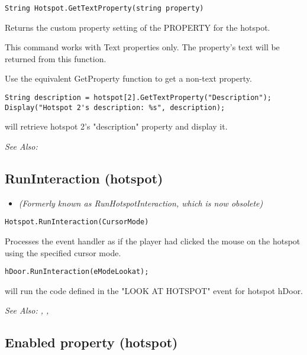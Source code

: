 \begin{verbatim}
String Hotspot.GetTextProperty(string property)
\end{verbatim}
Returns the custom property setting of the PROPERTY for the hotspot.

This command works with Text properties only. The property's text will be
returned from this function.

Use the equivalent GetProperty function to get a non-text property.

\begin{verbatim}
String description = hotspot[2].GetTextProperty("Description");
Display("Hotspot 2's description: %s", description);
\end{verbatim}
will retrieve hotspot 2's "description" property and display it.

\it{See Also:} 



\subsection{RunInteraction (hotspot)}\label{Hotspot.RunInteraction}%

\begin{itemize}
\item \it{(Formerly known as RunHotspotInteraction, which is now obsolete)}
\end{itemize}

\begin{verbatim}
Hotspot.RunInteraction(CursorMode)
\end{verbatim}
Processes the event handler as if the player had clicked the mouse
on the hotspot using the specified cursor mode.

\begin{verbatim}
hDoor.RunInteraction(eModeLookat);
\end{verbatim}
will run the code defined in the "LOOK AT HOTSPOT" event for hotspot hDoor.

\it{See Also:} ,
,


\subsection{Enabled property (hotspot)}\label{Hotspot.Enabled}%

